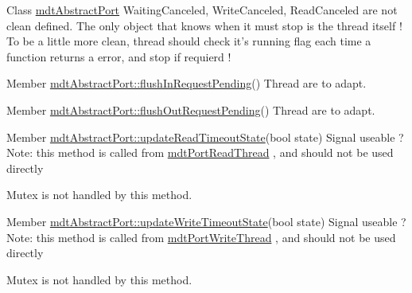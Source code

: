 \label{todo__todo000010}
\hypertarget{todo__todo000010}{}
 
\begin{DoxyDescription}
\item[Class \hyperlink{classmdt_abstract_port}{mdtAbstractPort} ]WaitingCanceled, WriteCanceled, ReadCanceled are not clean defined. The only object that knows when it must stop is the thread itself ! To be a little more clean, thread should check it's running flag each time a function returns a error, and stop if requierd ! 
\end{DoxyDescription}

\label{todo__todo000011}
\hypertarget{todo__todo000011}{}
 
\begin{DoxyDescription}
\item[Member \hyperlink{classmdt_abstract_port_a54b7bfb725c91b2c292a39275b877207}{mdtAbstractPort::flushInRequestPending}() ]Thread are to adapt. 
\end{DoxyDescription}

\label{todo__todo000012}
\hypertarget{todo__todo000012}{}
 
\begin{DoxyDescription}
\item[Member \hyperlink{classmdt_abstract_port_a2cc79d9288bebafaa183753dcf0807f3}{mdtAbstractPort::flushOutRequestPending}() ]Thread are to adapt. 
\end{DoxyDescription}

\label{todo__todo000013}
\hypertarget{todo__todo000013}{}
 
\begin{DoxyDescription}
\item[Member \hyperlink{classmdt_abstract_port_a0fc7317e988d5dea53a999cd1bf4faa9}{mdtAbstractPort::updateReadTimeoutState}(bool state) ]Signal useable ? Note: this method is called from \hyperlink{classmdt_port_read_thread}{mdtPortReadThread} , and should not be used directly\par
 Mutex is not handled by this method. 
\end{DoxyDescription}

\label{todo__todo000014}
\hypertarget{todo__todo000014}{}
 
\begin{DoxyDescription}
\item[Member \hyperlink{classmdt_abstract_port_ab51135de1f7bbc4707c3284f924c98dc}{mdtAbstractPort::updateWriteTimeoutState}(bool state) ]Signal useable ? Note: this method is called from \hyperlink{classmdt_port_write_thread}{mdtPortWriteThread} , and should not be used directly\par
 Mutex is not handled by this method. 
\end{DoxyDescription}

